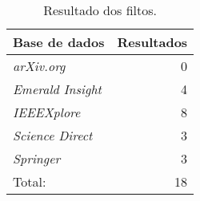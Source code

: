 \begin{table}[!htb]
    \centering
    \caption[Resultado dos filtros aplicados nas buscas por artigos]{Resultado dos filtos.
    \label{tab:resultadosFiltros1}}
    \begin{tabular}{lr}
        \toprule
           \textbf{Base de dados} & \textbf{Resultados} \\ \hline
        \midrule
            \textit{arXiv.org}              & 0                  \\
		\textit{Emerald Insight}        & 4                   \\
		\textit{IEEEXplore}             & 8                  \\
		\textit{Science Direct}         & 3                    \\
		\textit{Springer}               & 3                    \\ 
	\midrule
		Total:			& 18			\\ \hline
        \bottomrule
    \end{tabular}
\end{table}